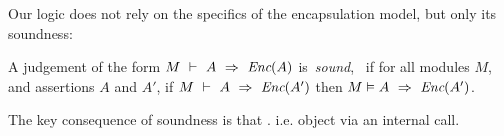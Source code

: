 
Our logic does not rely on the specifics of the encapsulation
  model, but only its soundness:

\begin{definition}
\label{lem:encap-soundness}
A judgement of the form $M\ \vdash\ A\ \Rightarrow\ \textit{Enc}(A)$  is\  \emph{sound}, \ if 
for all modules $M$, and assertions $A$ and $A'$, if 
$M\ \vdash\ A\ \Rightarrow\ \textit{Enc}(A')$ then $M \vDash A\ \Rightarrow\ \textit{Enc}(A')$.
\end{definition}

\noindent 
The key consequence of soundness is that . i.e.  object 
   via an internal call.


